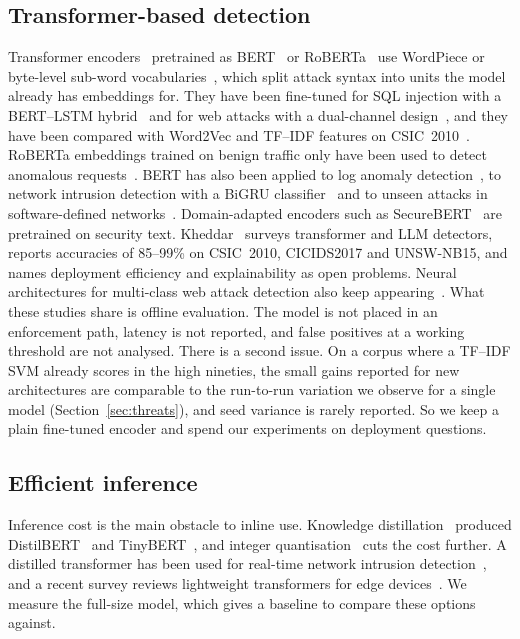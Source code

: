 \documentclass[preprint,11pt]{elsarticle}
\begin{document}
\subsection{Transformer-based detection}
Transformer encoders~\cite{vaswani2017attention} pretrained as
BERT~\cite{devlin2019bert} or RoBERTa~\cite{liu2019roberta} use WordPiece
or byte-level sub-word vocabularies~\cite{wu2016gnmt}, which split attack
syntax into units the model already has embeddings for. They have been
fine-tuned for SQL injection with a BERT--LSTM
hybrid~\cite{liu2024bertlstm} and for web attacks with a dual-channel
design~\cite{wadbert2026}, and they have been compared with Word2Vec and
TF--IDF features on CSIC~2010~\cite{priatna2024transformer}. RoBERTa
embeddings trained on benign traffic only have been used to detect
anomalous requests~\cite{http2vec2021}. BERT has also been applied to log
anomaly detection~\cite{guo2021logbert}, to network intrusion detection
with a BiGRU classifier~\cite{yang2025bertids} and to unseen attacks in
software-defined networks~\cite{sdnbert2024}. Domain-adapted encoders such
as SecureBERT~\cite{aghaei2022securebert,aghaei2025securebert2} are
pretrained on security text. Kheddar~\cite{kheddar2025survey} surveys
transformer and LLM detectors, reports accuracies of 85--99\% on CSIC~2010,
CICIDS2017 and UNSW-NB15, and names deployment efficiency and
explainability as open problems. Neural architectures for multi-class web
attack detection also keep appearing~\cite{zhou2025ewebguard}. What these
studies share is offline evaluation. The model is not placed in an
enforcement path, latency is not reported, and false positives at a working
threshold are not analysed. There is a second issue. On a corpus where a
TF--IDF SVM already scores in the high nineties, the small gains reported
for new architectures are comparable to the run-to-run variation we observe
for a single model (Section~\ref{sec:threats}), and seed variance is rarely
reported. So we keep a plain fine-tuned encoder and spend our experiments
on deployment questions.

\subsection{Efficient inference}
Inference cost is the main obstacle to inline use. Knowledge
distillation~\cite{hinton2015distilling} produced
DistilBERT~\cite{sanh2019distilbert} and TinyBERT~\cite{jiao2020tinybert},
and integer quantisation~\cite{jacob2018quantization} cuts the cost
further. A distilled transformer has been used for real-time network
intrusion detection~\cite{distilxids2025}, and a recent survey reviews
lightweight transformers for edge devices~\cite{lightweightedge2026}. We
measure the full-size model, which gives a baseline to compare these
options against.
\end{document}
